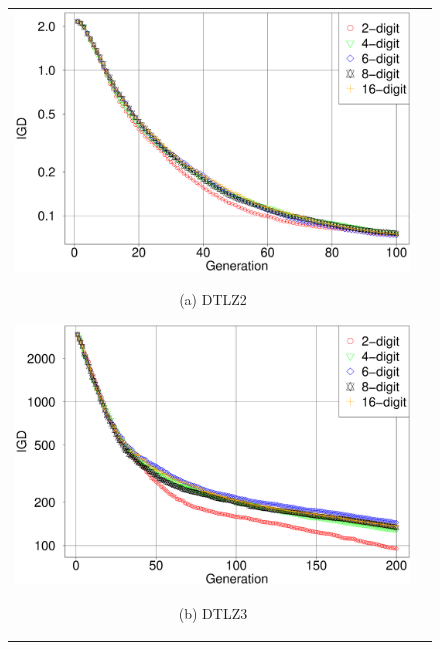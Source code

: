 \documentclass[../main/main]{subfiles}
\begin{document}
\begin{figure}[htbp]
\begin{tabular}{cc}
\begin{minipage}{0.32\hsize}
\includegraphics[width=1\linewidth]{../figures/MOEAD/DTLZ2_IGD.eps}
\begin{center}
{\footnotesize (a) DTLZ2}
\end{center}
\end{minipage}
\begin{minipage}{0.32\hsize}
\includegraphics[width=1\linewidth]{../figures/MOEAD/DTLZ3_IGD.eps}
\begin{center}
{\footnotesize (b) DTLZ3}
\end{center}
\end{minipage}
\begin{minipage}{0.32\hsize}

\end{minipage}
\end{tabular}
\end{figure}
\end{document}
